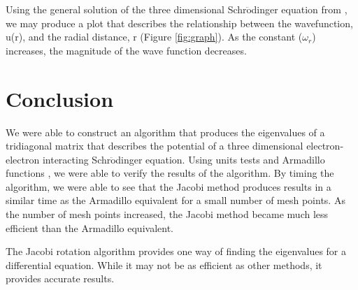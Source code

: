 \documentclass[%
reprint,
superscriptaddress,
showpacs,
nofootinbib,
bibnotes,amsmath,amssymb,aps,
prc, 
]{revtex4-1}
\begin{document}
	Using the general solution of the three dimensional Schr$\ddot{\textrm{o}}$dinger equation from \cite{PhysRevA.48.3561}, we may produce a plot that describes the relationship between the wavefunction, u(r), and the radial distance, r (Figure \ref{fig:graph}).  As the constant ($\omega_{r}$) increases, the magnitude of the wave function decreases.
	
	




\section{Conclusion}

We were able to construct an algorithm that produces the eigenvalues of a tridiagonal matrix that describes the potential of a three dimensional electron-electron interacting Schr$\ddot{\textrm{o}}$dinger equation.  Using units tests and Armadillo functions \cite{Armadillo}, we were able to verify the results of the algorithm.  By timing the algorithm, we were able to see that the Jacobi method produces results in a similar time as the Armadillo equivalent for a small number of mesh points.  As the number of mesh points increased, the Jacobi method became much less efficient than the Armadillo equivalent.

The Jacobi rotation algorithm provides one way of finding the eigenvalues for a differential equation.  While it may not be as efficient as other methods, it provides accurate results.


	
	
	
	
		
	
	
	
\end{document}
